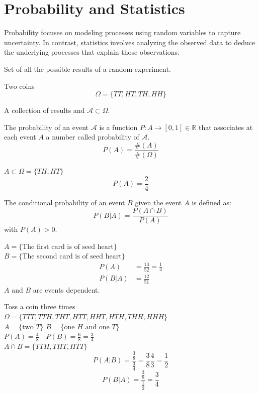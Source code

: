 \documentclass{article}
\begin{document}
\section{Probability and Statistics}
Probability focuses on modeling processes using random variables to capture
uncertainty. In contrast, statistics involves analyzing the observed data to
deduce the underlying processes that explain those observations.
\begin{definition}
    Set of all the possible results of a random experiment.
\end{definition}
\begin{example}
   Two coins 
   $$\Omega=\{TT,HT,TH,HH\}$$
\end{example}
\begin{definition}
    A collection of results and $\mathcal{A}\subset\Omega$.
\end{definition}
\begin{definition}[Probability P]
    The probability of an event $\mathcal{A}$ is a function
    $P:A\to[0,1]\in
    \mathbb{R}$ that associates at each event $A$ a number called probability
    of $\mathcal{A}$.
    $$P(A)=\frac{\#(A)}{\#(\Omega)}$$
\end{definition}
\begin{example}
    $A\subset\Omega=\{TH,HT\}$
    $$P(A)=\frac{2}{4}$$
\end{example}
\begin{definition}
    The conditional probability of an event $B$ given the event $A$ is defined
    as:
    $$P(B|A)=\frac{P(A\cap B)}{P(A)}$$
    with $P(A)>0$.
\end{definition}
\begin{example}
    $A=\{\text{The first card is of seed heart}\}$ \\
    $B=\{\text{The second card is of seed heart}\}$
    $$
    \begin{aligned}
        P(A)&=\frac{13}{52}=\frac{1}{4}\\
        P(B|A)&=\frac{12}{51}
    \end{aligned}
    $$
    $A$ and $B$ are events dependent.
\end{example}
\begin{example}
   Toss a coin three times\\
   $\Omega=\{TTT,TTH,THT,HTT,HHT,HTH,THH,HHH\}$\\ 
   $A=\{\text{two }T\}$
   $B=\{\text{one } H\text{ and one }T\}$\\
   $P(A)=\frac{4}{8}\quad P(B)=\frac{6}{8}=\frac{3}{4}$\\
   $A\cap B=\{TTH,THT,HTT\}$
   $$P(A|B)=\frac{\frac{3}{8}}{\frac{3}{4}}=\frac{3}{8}\frac{4}{3}=\frac{1}{2}$$
   $$P(B|A)=\frac{\frac{3}{8}}{\frac{1}{2}}=\frac{3}{4}$$
\end{example}
\end{document}
